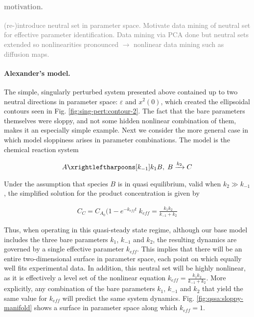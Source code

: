 \documentclass{article}
\newcommand{\eps}{\varepsilon}
\begin{document}
\textcolor{gray}{
\paragraph{motivation.}
(re-)introduce neutral set in parameter space.  Motivate data mining
of neutral set for effective parameter identification.  Data mining
via PCA done \cite{ADS06} but neutral sets extended so nonlinearities
pronounced $\rightarrow$ nonlinear data mining such as diffusion
maps.}

\paragraph{Alexander's model.}
The simple, singularly perturbed system presented above contained up
to two neutral directions in parameter space: $\eps$ and $x^2(0)$,
which created the ellipsoidal contours seen in
Fig. \ref{fig:sing-pert:contour-2}. The fact that the bare parameters
themselves were sloppy, and not some hidden nonlinear combination
of them, makes it an especially simple example. Next we consider the
more general case in which model sloppiness arises in parameter
combinations. The model is the chemical reaction system

\begin{align*}
  A \xrightleftharpoons[k_{-1}]{k_1} B, \; B \xrightarrow[]{k_2} C
\end{align*}

Under the assumption that species $B$ is in quasi equilibrium, valid
when $k_2 \gg k_{-1}$, the simplified solution for the product
concentration is given by

\begin{align*}
  C_C = C_{A_0}(1 - e^{-k_{eff} t} \; k_{eff} = \frac{k_1 k_2}{k_{-1} + k_2}
\end{align*}

Thus, when operating in this quasi-steady state regime, although our
base model includes the three bare parameters $k_1$, $k_{-1}$ and
$k_2$, the resulting dynamics are governed by a single effective
parameter $k_{eff}$. This implies that there will be an entire
two-dimensional surface in parameter space, each point on which
equally well fits experimental data. In addition, this neutral set
will be highly nonlinear, as it is effectively a level set of the
nonlinear equation $k_{eff} = \frac{k_1 k_2}{k_{-1} + k_2}$. More
explicitly, any combination of the bare parameters $k_1$, $k_{-1}$ and
$k_2$ that yield the same value for $k_{eff}$ will predict the same
system dynamics. Fig. \ref{fig:qssa:sloppy-manifold} shows a surface
in parameter space along which $k_{eff} = 1$.
\end{document}
